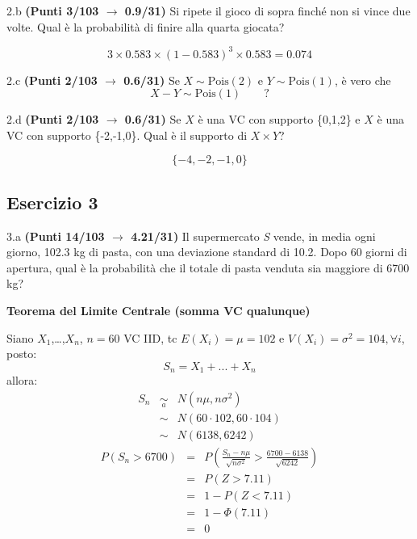 \documentclass[
  11pt,
]{book}
\theoremstyle{mytheoremstyle}
\theoremstyle{mydefstyle}
\newenvironment{sol}
  {
  \begin{tcolorbox}[enhanced,breakable,arc=0.1mm,boxrule=1pt,colback=white,colframe=iblue,
  title=\bf \fontfamily{lmss}\selectfont \hspace{.5 cm} Soluzione,drop fuzzy shadow]

}{
\end{tcolorbox}
  }
\begin{document}
2.b \textbf{(Punti 3/103 \(\rightarrow\) 0.9/31)} Si ripete il gioco di sopra finché non si vince due volte. Qual è la probabilità di finire alla quarta giocata?

\begin{sol}
\[
3\times 0.583\times (1-0.583)^3\times 0.583 = 0.074
\]

\end{sol}

2.c \textbf{(Punti 2/103 \(\rightarrow\) 0.6/31)} Se \(X\sim \text{Pois}(2)\) e \(Y\sim\text{Pois}(1)\), è vero che
\[
X-Y\sim\text{Pois}(1)\qquad ?
\]

2.d \textbf{(Punti 2/103 \(\rightarrow\) 0.6/31)} Se \(X\) è una VC con supporto \{0,1,2\} e \(X\) è una VC con supporto \{-2,-1,0\}.
Qual è il supporto di \(X\times Y\)?

\[
\{-4,-2,-1,0\}
\]

\subsection{Esercizio 3}\label{esercizio-3-14}

3.a \textbf{(Punti 14/103 \(\rightarrow\) 4.21/31)} Il supermercato \emph{S} vende, in media ogni giorno, 102.3 kg di pasta, con una deviazione standard di 10.2. Dopo 60 giorni di apertura, qual è la probabilità che il totale di pasta venduta sia maggiore di 6700 kg?

\textbf{Teorema del Limite Centrale (somma VC qualunque)}

Siano \(X_1\),\ldots,\(X_n\), \(n=60\) VC IID, tc \(E(X_i)=\mu=102\) e \(V(X_i)=\sigma^2=104,\forall i\), posto:
\[
      S_n = X_1 + ... + X_n
      \]
allora:\begin{eqnarray*}
  S_n & \mathop{\sim}\limits_{a}& N(n\mu,n\sigma^2) \\
     &\sim & N(60\cdot102,60\cdot104) \\
     &\sim & N(6138,6242) 
  \end{eqnarray*}\begin{eqnarray*}
      P( S_n   >   6700 ) 
        &=& P\left(  \frac { S_n  -  n\mu }{ \sqrt{n\sigma^2} }  >  \frac { 6700  -  6138 }{\sqrt{ 6242 }} \right)  \\
                 &=& P\left(  Z   >   7.11 \right) \\    &=& 1-P(Z< 7.11 )\\ 
                 &=&  1-\Phi( 7.11 ) \\ &=&  0 
      \end{eqnarray*}
\end{document}
